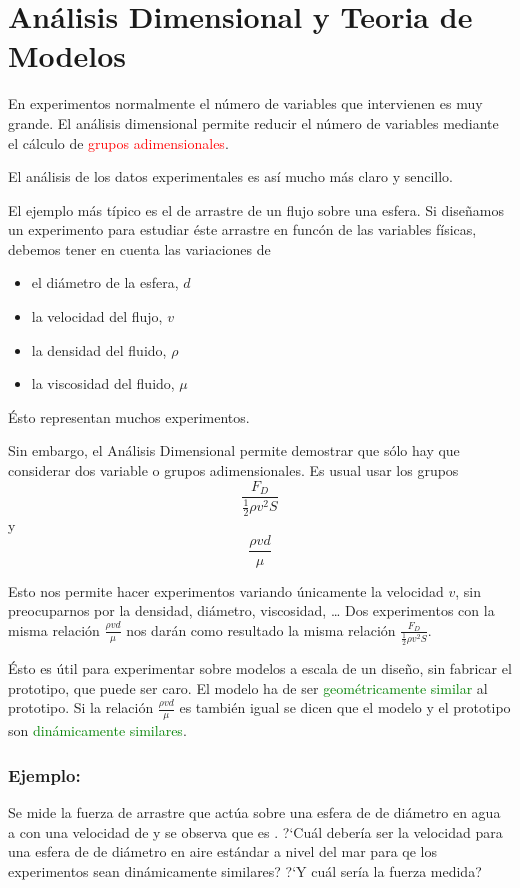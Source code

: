 \chapter[Análisis Dimensional]{Análisis Dimensional y Teoria de Modelos}

	
	En experimentos normalmente el número de variables que intervienen
	es muy grande. El análisis dimensional permite reducir el número de
	variables mediante el cálculo de \textcolor{red}{grupos adimensionales}.
	
	El análisis de los datos experimentales es así mucho más claro y sencillo.
	
	El ejemplo más típico es el de arrastre de un flujo sobre una esfera.
	Si diseñamos un experimento para estudiar éste arrastre en funcón
	de las variables físicas, debemos tener en cuenta las variaciones
	de 
	\begin{itemize}
		\item {el diámetro de la esfera, $d$} 
		\item {la velocidad del flujo, $v$} 
		\item {la densidad del fluido, $\rho$} 
		\item {la viscosidad del fluido, $\mu$} 
	\end{itemize}
	Ésto representan muchos experimentos.

	
	Sin embargo, el Análisis Dimensional permite demostrar que sólo hay
	que considerar dos variable o grupos adimensionales. Es usual usar
	los grupos 
	\[
	\frac{F_{D}}{\frac{1}{2}\rho v^{2}S}
	\]
	y 
	\[
	\frac{\rho vd}{\mu}
	\]
	
	Esto nos permite hacer experimentos variando únicamente la velocidad
	$v$, sin preocuparnos por la densidad, diámetro, viscosidad, \ldots{}
	Dos experimentos con la misma relación $\frac{\rho vd}{\mu}$ nos
	darán como resultado la misma relación $\frac{F_{D}}{\frac{1}{2}\rho v^{2}S}$.
	
	Ésto es útil para experimentar sobre modelos a escala de un diseño,
	sin fabricar el prototipo, que puede ser caro. El modelo ha de ser
	\textcolor{green}{geométricamente similar} al prototipo. Si la relación
	$\frac{\rho vd}{\mu}$ es también igual se dicen que el modelo y el
	prototipo son \textcolor{green}{dinámicamente similares}.

	
	\subsection*{Ejemplo:}
		Se mide la fuerza de arrastre que actúa sobre una esfera de  de diámetro
		en agua a  con una velocidad de  y se observa que es . ?`Cuál debería
		ser la velocidad para una esfera de  de diámetro en aire estándar
		a nivel del mar para qe los experimentos sean dinámicamente similares?
		?`Y cuál sería la fuerza medida?
		
